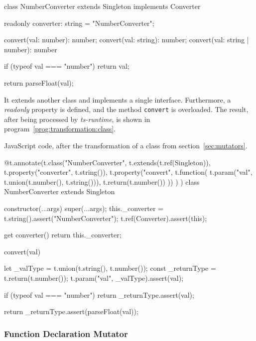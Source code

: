 \begin{JsCode}
class NumberConverter extends Singleton implements Converter {

  readonly converter: string = "NumberConverter";

  convert(val: number): number;
  convert(val: string): number;
  convert(val: string | number): number {
    if (typeof val === "number") {
      return val;
    }
        
    return parseFloat(val);
  }

}
\end{JsCode}
It extends another class and implements a single interface. Furthermore, a \emph{readonly} property is defined, and the method \texttt{convert} is overloaded. The result, after being processed by \emph{ts-runtime}, is shown in program~\ref{prog:transformation:class}.
\begin{program}
\caption{JavaScript code, after the transformation of a class from section~\ref{sec:mutators}.}
\label{prog:transformation:class}
\begin{JsCode}
@t.annotate(t.class("NumberConverter", t.extends(t.ref(Singleton)),
  t.property("converter", t.string()),
  t.property("convert",
    t.function(
      t.param("val", t.union(t.number(), t.string())),
      t.return(t.number())
    ))
  )
)
class NumberConverter extends Singleton {

  constructor(...args) {
    super(...args);
    this._converter = t.string().assert("NumberConverter");
    t.ref(Converter).assert(this);
  }
  
  get converter() {
    return this._converter;
  }
  
  convert(val) {
    let _valType = t.union(t.string(), t.number());
    const _returnType = t.return(t.number());
    t.param("val", _valType).assert(val);
    
    if (typeof val === "number") {
      return _returnType.assert(val);
    }
    
    return _returnType.assert(parseFloat(val));
  }
  
}
\end{JsCode}
\end{program}

\subsubsection{Function Declaration Mutator}

